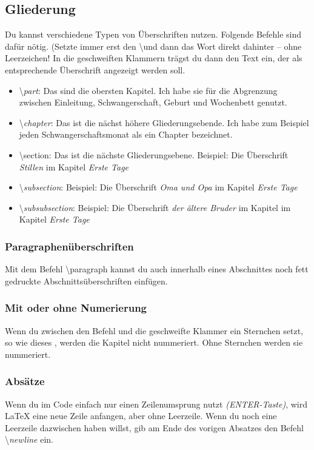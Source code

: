 \subsection{Gliederung}
Du kannst verschiedene Typen von Überschriften nutzen. Folgende Befehle sind dafür nötig. (Setzte immer erst den \textbackslash und dann das Wort direkt dahinter -- ohne Leerzeichen! In die geschweiften Klammern trägst du dann den Text ein, der als entsprechende Überschrift angezeigt werden soll.
\begin{itemize}
    \item \textbackslash \textit{part}: Das sind die obersten Kapitel. Ich habe sie für die Abgrenzung zwischen Einleitung, Schwangerschaft, Geburt und Wochenbett genutzt.
    \item \textbackslash \textit{chapter}: Das ist die nächst höhere Gliederungsebende. Ich habe zum Beispiel jeden Schwangerschaftsmonat als ein Chapter bezeichnet.
    \item \textbackslash se\textit{}ction: Das ist die nächste Gliederungsebene. Beispiel: Die Überschrift \emph{Stillen} im Kapitel \emph{Erste Tage}
    \item \textbackslash \textit{subsection}: Beispiel: Die Überschrift \emph{Oma und Opa} im Kapitel \emph{Erste Tage}
    \item \textbackslash \textit{subsubsection}: Beispiel: Die Überschrift \emph{der ältere Bruder} im Kapitel im Kapitel \emph{Erste Tage}
\end{itemize}

\subsubsection{Paragraphenüberschriften}
Mit dem Befehl \textbackslash paragraph kannst du auch innerhalb eines Abschnittes noch fett gedruckte Abschnittsüberschriften einfügen.


\subsubsection{Mit oder ohne Numerierung}
Wenn du zwischen den Befehl und die geschweifte Klammer ein Sternchen setzt, so wie dieses \*, werden die Kapitel nicht nummeriert. Ohne Sternchen werden sie nummeriert.

\subsubsection{Absätze}
Wenn du im Code einfach nur einen Zeilenumsprung nutzt \textit{(ENTER-Taste)}, wird \LaTeX{} eine neue Zeile anfangen, aber ohne Leerzeile. Wenn du noch eine Leerzeile dazwischen haben willst, gib am Ende des vorigen Absatzes den Befehl \textbackslash \textit{newline} ein.

